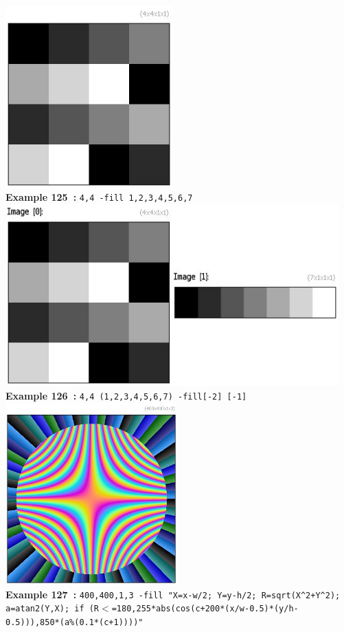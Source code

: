 \documentclass[a4paper,11pt,twoside]{book}
\begin{document}
\begin{center}\includegraphics[keepaspectratio=true,height=7cm,width=\textwidth]{img/gmic_def125.jpg}\\
{\footnotesize \textbf{Example 125~:} \texttt{4,4 -fill 1,2,3,4,5,6,7}}
\\\includegraphics[keepaspectratio=true,height=7cm,width=\textwidth]{img/gmic_def126.jpg}\\
{\footnotesize \textbf{Example 126~:} \texttt{4,4 (1,2,3,4,5,6,7) -fill[-2] [-1]}}
\\\includegraphics[keepaspectratio=true,height=7cm,width=\textwidth]{img/gmic_def127.jpg}\\
{\footnotesize \textbf{Example 127~:} \texttt{400,400,1,3 -fill "X=x-w/2; Y=y-h/2; R=sqrt(X\textasciicircum 2+Y\textasciicircum 2); a=atan2(Y,X); if (R$<$=180,255*abs(cos(c+200*(x/w-0.5)*(y/h-0.5))),850*(a\%(0.1*(c+1))))"}}
\end{center}
\end{document}
